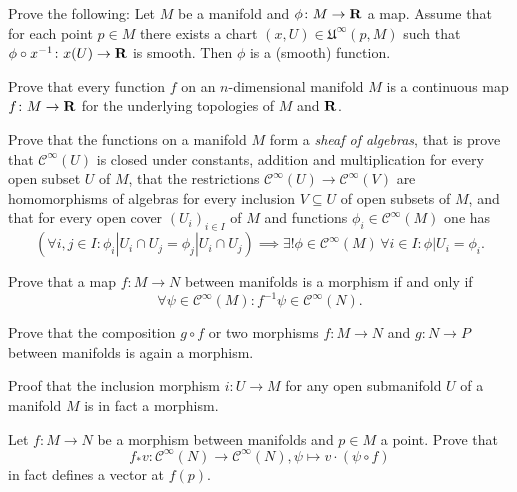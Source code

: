 \begin{xca}
  Prove the following:
  Let $M$ be a manifold and $\phi\colon M \to \mathbf{R}$ a map. Assume that for each
  point $p \in M$ there exists a chart $(x, U) \in \mathfrak U^\infty(p, M)$
  such that $\phi \circ x^{-1}\colon x(U) \to \mathbf{R}$ is smooth. Then $\phi$
  is a (smooth) function.
\end{xca}

\begin{xca}
  Prove that every function $f$ on an $n$-dimensional manifold $M$ is a
  continuous map $f\colon M \to \mathbf{R}$ for the underlying topologies of $M$ and
  $\mathbf{R}$.
\end{xca}

\begin{xca}
  Prove that the functions on a manifold $M$ form a \emph{sheaf of algebras},
  that is prove that $\mathcal C^\infty(U)$ is closed under constants,
  addition and multiplication for every open subset $U$ of $M$, that the restrictions
  $\mathcal C^\infty(U) \to \mathcal C^\infty(V)$ are homomorphisms of algebras
  for every inclusion $V \subseteq U$ of open subsets of $M$, and that 
  for every open cover $(U_i)_{i \in I}$ of $M$ and functions
  $\phi_i \in \mathcal C^\infty(M)$ one has
  \[
    \left(\forall i, j \in I : \phi_i|U_i \cap U_j = \phi_j|U_i \cap U_j\right)
    \implies \exists! \phi \in \mathcal C^\infty(M) \, \forall i \in I :
    \phi|U_i = \phi_i.
  \]
\end{xca}

\begin{xca}
  Prove that a map $f\colon M \to N$ between manifolds is a morphism if and only if
  \[
    \forall \psi \in \mathcal C^\infty(M):
    f^{-1} \psi \in \mathcal C^\infty(N).
  \]
\end{xca}

\begin{xca}
  Prove that the composition $g \circ f$ or two morphisms $f\colon M \to N$
  and $g\colon N \to P$ between manifolds is again a morphism.
\end{xca}

\begin{xca}
  Proof that the inclusion morphism $i\colon U \to M$ for any open submanifold
  $U$ of a manifold $M$ is in fact a morphism.
\end{xca}

\begin{xca}
  Let $f\colon M \to N$ be a morphism between manifolds and $p \in M$ a point.
  Prove that
  \[
    f_* v\colon \mathcal C^\infty(N) \to \mathcal C^\infty(N),
    \psi \mapsto v \cdot (\psi \circ f)
  \]
  in fact defines a vector at $f(p)$.
\end{xca}

